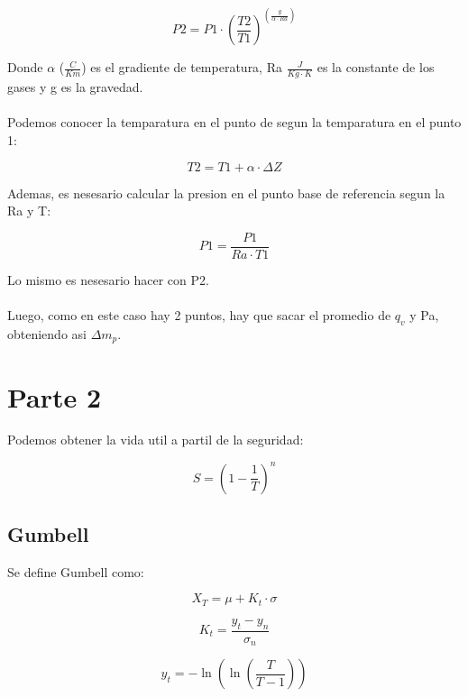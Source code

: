 \begin{equation}
    P2 = P1 \cdot (\frac{T2}{T1})^(\frac{g}{\alpha \cdot Ra})
\end{equation}

Donde $\alpha$ ($\frac{C}{Km}$) es el gradiente de temperatura, Ra $\frac{J}{Kg \cdot K}$ es la constante de los gases y g es la gravedad.
\\ \\
Podemos conocer la temparatura en el punto de segun la temparatura en el punto 1:

\begin{equation}
    T2 = T1 + \alpha \cdot \Delta Z
\end{equation}

Ademas, es nesesario calcular la presion en el punto base de referencia segun la Ra y T:

\begin{equation}
    P1 = \frac{P1}{Ra \cdot T1}
\end{equation}

Lo mismo es nesesario hacer con P2.
\\ \\
Luego, como en este caso hay 2 puntos, hay que sacar el promedio de $q_v$ y Pa, obteniendo asi $\Delta m_p$.  

\section{Parte 2}

Podemos obtener la vida util a partil de la seguridad:

\begin{equation}
    S = (1 - \frac{1}{T})^n
\end{equation}

\subsection{Gumbell}

Se define Gumbell como:

\begin{equation}
    X_T = \mu + K_t \cdot \sigma
\end{equation}

\begin{equation}
    K_t = \frac{y_t - y_n}{\sigma_n}
\end{equation}

\begin{equation}
    y_t = -\ln(\ln(\frac{T}{T-1}))
\end{equation}

